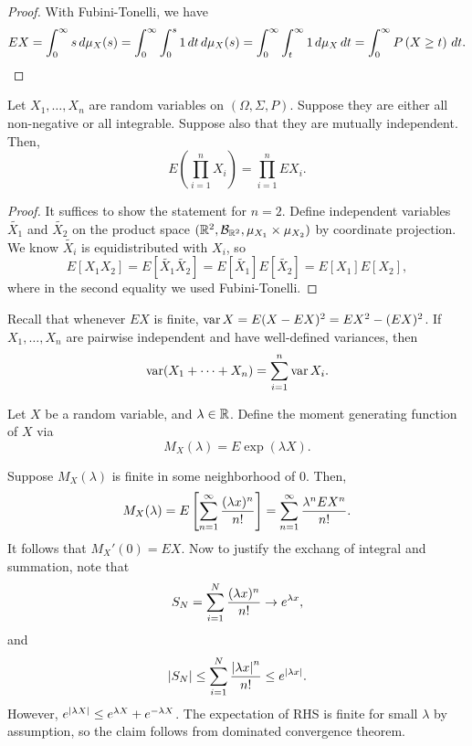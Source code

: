 \documentclass[a4paper]{article}
\begin{document}
\begin{proof}
  With Fubini-Tonelli, we have
  \[
    E X = \int_0^\infty s \, d \mu_X (s)
    = \int_0^\infty \int_0^s 1 \, d t \, d \mu_X (s)
    = \int_0^\infty \int_t^\infty 1 \, d \mu_X \, d t
    = \int_0^\infty P \left( X \geq t \right) \, d t.
  \]

\end{proof}

\begin{prop}
  Let $X_1, \dots, X_n$ are random variables on $(\Omega, \Sigma, P)$.
  Suppose they are either all non-negative or all integrable.
  Suppose also that they are mutually independent. Then,
  \[
    E \left( \prod_{i=1}^n X_i \right) = \prod_{i=1}^n E X_i.
  \]
\end{prop}

\begin{proof}
  It suffices to show the statement for $n = 2$. Define
  independent variables $\tilde{X_1}$ and $\tilde{X_2}$
  on the product space $(\mathbb{R}^2, \mathcal{B}_{\mathbb{R}^2}, \mu_{X_1} \times \mu_{X_2})$
  by coordinate projection. We know $\tilde{X_i}$ is equidistributed
  with $X_i$, so
  \[
    E [X_1 X_2] = E [\tilde{X_1} \tilde{X_2}] = E [\tilde{X_1} ] E
      [ \tilde{X_2} ] = E [X_1] E [X_2] ,
  \]
  where in the second equality we used Fubini-Tonelli.

\end{proof}

\begin{remark}
  Recall that whenever $E X$ is finite, $\operatorname{var} X = E (X - E X)^2
    = E X^2 - (E X)^2$. If $X_1, \dots, X_n$ are pairwise independent
  and have well-defined variances, then
  \[
    \operatorname{var} (X_1 + \dots + X_n) = \sum_{i=1}^n \operatorname{var} X_i.
  \]
\end{remark}

\begin{defi}
  Let $X$ be a random variable, and $\lambda \in \mathbb{R}$. Define the
  moment generating function of $X$ via
  \[
    M_X (\lambda) = E \exp (\lambda X).
  \]
\end{defi}

Suppose $M_X (\lambda)$ is finite in some neighborhood of $0$. Then,
\[
  M_X (\lambda)
  = E \left[ \sum_{n=1}^\infty \frac{(\lambda x)^n}{n!} \right]
  = \sum_{n=1}^\infty \frac{\lambda^n E X^n}{n!}.
\]
It follows that $M_X' (0) = E X$. Now to justify the exchang of
integral and summation, note that
\[
  S_N = \sum_{i=1}^N \frac{(\lambda x)^n}{n!} \to e^{\lambda x},
\]
and
\[
  \left\lvert S_N\right\rvert \leq \sum_{i=1}^N \frac{\left\lvert \lambda x\right\rvert^n}{n!}
  \leq e^{\left\lvert \lambda x\right\rvert}.
\]
However, $e^{\left\lvert \lambda X\right\rvert} \leq e^{\lambda X} + e^{- \lambda X}$.
The expectation of RHS is finite for small $\lambda$ by assumption,
so the claim follows from dominated convergence theorem.
\end{document}
